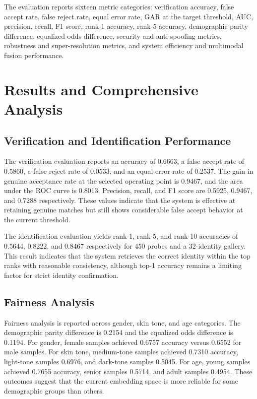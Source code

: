 \documentclass[conference]{IEEEtran}
\begin{document}
The evaluation reports sixteen metric categories: verification accuracy, false accept rate, false reject rate, equal error rate, GAR at the target threshold, AUC, precision, recall, F1 score, rank-1 accuracy, rank-5 accuracy, demographic parity difference, equalized odds difference, security and anti-spoofing metrics, robustness and super-resolution metrics, and system efficiency and multimodal fusion performance.

\section{Results and Comprehensive Analysis}
\subsection{Verification and Identification Performance}
The verification evaluation reports an accuracy of 0.6663, a false accept rate of 0.5860, a false reject rate of 0.0533, and an equal error rate of 0.2537. The gain in genuine acceptance rate at the selected operating point is 0.9467, and the area under the ROC curve is 0.8013. Precision, recall, and F1 score are 0.5925, 0.9467, and 0.7288 respectively. These values indicate that the system is effective at retaining genuine matches but still shows considerable false accept behavior at the current threshold.

The identification evaluation yields rank-1, rank-5, and rank-10 accuracies of 0.5644, 0.8222, and 0.8467 respectively for 450 probes and a 32-identity gallery. This result indicates that the system retrieves the correct identity within the top ranks with reasonable consistency, although top-1 accuracy remains a limiting factor for strict identity confirmation.

\subsection{Fairness Analysis}
Fairness analysis is reported across gender, skin tone, and age categories. The demographic parity difference is 0.2154 and the equalized odds difference is 0.1194. For gender, female samples achieved 0.6757 accuracy versus 0.6552 for male samples. For skin tone, medium-tone samples achieved 0.7310 accuracy, light-tone samples 0.6976, and dark-tone samples 0.5045. For age, young samples achieved 0.7655 accuracy, senior samples 0.5714, and adult samples 0.4954. These outcomes suggest that the current embedding space is more reliable for some demographic groups than others.
\end{document}
